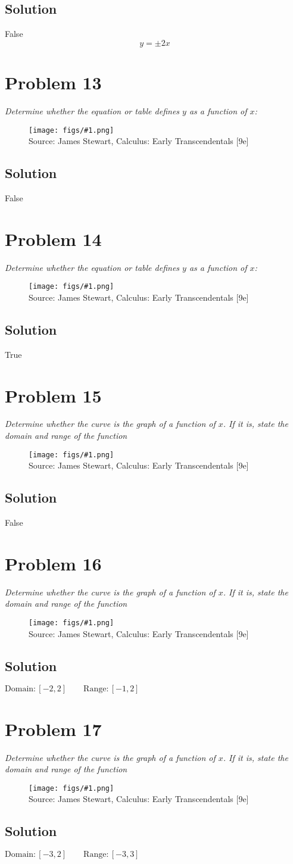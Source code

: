 \documentclass[11pt]{article}
\newcommand{\soln}{\subsection*}
\newcommand{\qn}{\textit}
\newcommand{\imagesource}[1]{{\footnotesize Source: #1}}
\newcommand{\imgqn}[1]{
	\begin{figure}[h]
		\centering
		\texttt{[image: figs/\#1.png]}\\
		\imagesource{James Stewart, Calculus: Early Transcendentals [9e]}
	\end{figure}
}
\begin{document}
\soln{Solution}
False
$$y=\pm2x$$

\section*{Problem 13}

\qn{Determine whether the equation or table defines $y$ as a function of $x$:}

\imgqn{1.1.13}

\soln{Solution}
False

\section*{Problem 14}

\qn{Determine whether the equation or table defines $y$ as a function of $x$:}

\imgqn{1.1.14}

\soln{Solution}
True

\section*{Problem 15}

\qn{Determine whether the curve is the graph of a function of $x$. If it is, state the domain and range of the function}

\imgqn{1.1.15}

\soln{Solution}
False

\section*{Problem 16}

\qn{Determine whether the curve is the graph of a function of $x$. If it is, state the domain and range of the function}

\imgqn{1.1.16}

\soln{Solution}
$\mathrm{Domain}:[-2,2] \qquad\mathrm{Range}:[-1,2]$

\section*{Problem 17}

\qn{Determine whether the curve is the graph of a function of $x$. If it is, state the domain and range of the function}

\imgqn{1.1.17}

\soln{Solution}
$\mathrm{Domain}:[-3,2] \qquad\mathrm{Range}:[-3,3]$
\end{document}
